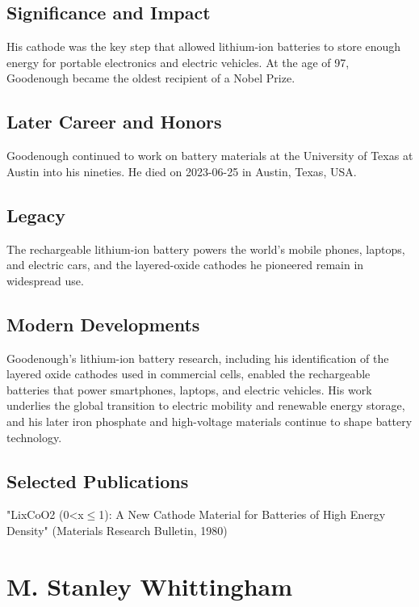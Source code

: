 \subsection*{Significance and Impact}

His cathode was the key step that allowed lithium-ion batteries to store enough energy for portable electronics and electric vehicles. At the age of 97, Goodenough became the oldest recipient of a Nobel Prize.

\subsection*{Later Career and Honors}

Goodenough continued to work on battery materials at the University of Texas at Austin into his nineties. He died on 2023-06-25 in Austin, Texas, USA.

\subsection*{Legacy}

The rechargeable lithium-ion battery powers the world's mobile phones, laptops, and electric cars, and the layered-oxide cathodes he pioneered remain in widespread use.

\subsection*{Modern Developments}

Goodenough's lithium-ion battery research, including his identification of the layered oxide cathodes used in commercial cells, enabled the rechargeable batteries that power smartphones, laptops, and electric vehicles. His work underlies the global transition to electric mobility and renewable energy storage, and his later iron phosphate and high-voltage materials continue to shape battery technology.

\subsection*{Selected Publications}

"LixCoO2 (0<x$\leq$1): A New Cathode Material for Batteries of High Energy Density" (Materials Research Bulletin, 1980)

\clearpage

\section{M. Stanley Whittingham}

